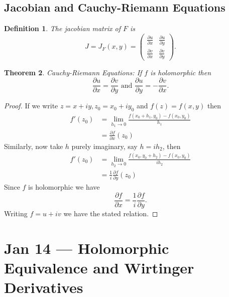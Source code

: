 \documentclass[a4paper]{article}
\newtheorem{thm}{Theorem}[section]
\newtheorem{defn}[thm]{Definition}
\begin{document}
\subsection{Jacobian and Cauchy-Riemann Equations}
\begin{defn}
    The jacobian matrix of $F$ is \[
    J=J_F(x,y)=\begin{pmatrix}
        {\frac{\partial u}{\partial x} } & {\frac{\partial u}{\partial y} } \\ 
        {\frac{\partial v}{\partial x} } & {\frac{\partial v}{\partial y} }
    \end{pmatrix}
    .\] 
\end{defn}
\begin{thm}
    Cauchy-Riemann Equations: If $f$ is holomorphic then 
    \[
    \frac{\partial u}{\partial x} = \frac{\partial v}{\partial y}  \text{ and } \frac{\partial u}{\partial y} =-\frac{\partial v}{\partial x} 
    .\] 
\end{thm}
\begin{proof}
    If we write $z=x+iy,z_0=x_0+iy_0$ and $f(z)=f(x,y)$ then 
    \begin{align*}
        f'(z_0)&=\lim_{h_1\to 0} \frac{f(x_0+h_1,y_0)-f(x_0,y_0)}{h_1}\\
        &=\frac{\partial f}{\partial x} (z_0)
    \end{align*}
    Similarly, now take $h$ purely imaginary, say $h=ih_2$, then 
    \begin{align*}
        f'(z_0)&=\lim_{h_2\to 0}  \frac{f(x_0,y_0+h_2)-f(x_0,y_0)}{ih_2}\\
        &=\frac{1}{i}\frac{\partial f}{\partial y} (z_0)
    \end{align*}
    Since $f$ is holomorphic we have \[
    \frac{\partial f}{\partial x} =\frac{1}{i}\frac{\partial f}{\partial y}
    .\] 
    Writing $f=u+iv$ we have the stated relation.
\end{proof}
\newpage
\section{Jan 14 --- Holomorphic Equivalence and Wirtinger Derivatives}
\end{document}

